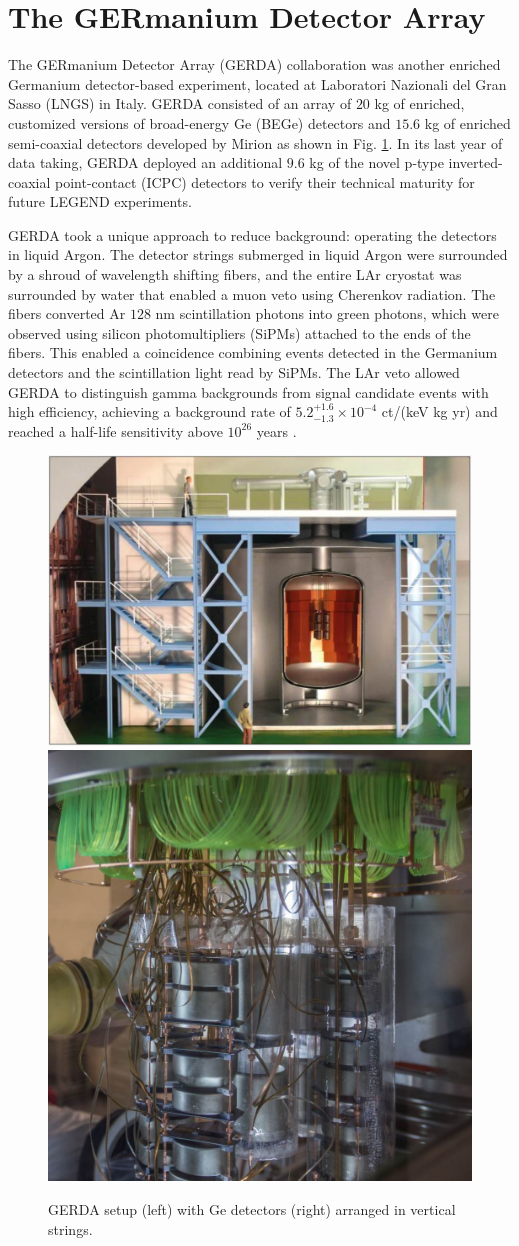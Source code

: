 \section{The GERmanium Detector Array}

The GERmanium Detector Array (GERDA) collaboration was another enriched Germanium detector-based experiment, located at Laboratori Nazionali del Gran Sasso (LNGS) in Italy. GERDA consisted of an array of $20$ kg of enriched, customized versions of broad-energy Ge (BEGe) detectors and $15.6$ kg of enriched semi-coaxial detectors developed by Mirion as shown in Fig. \ref{fig:gerda}. In its last year of data taking, GERDA deployed an additional $9.6$ kg of the novel p-type inverted-coaxial point-contact (ICPC) detectors to verify their technical maturity for future LEGEND experiments.

GERDA took a unique approach to reduce background: operating the detectors in liquid Argon. The detector strings submerged in liquid Argon were surrounded by a shroud of wavelength shifting fibers, and the entire LAr cryostat was surrounded by water that enabled a muon veto using Cherenkov radiation. The fibers converted Ar $128$ nm scintillation photons into green photons, which were observed using silicon photomultipliers (SiPMs) attached to the ends of the fibers. This enabled a coincidence combining events detected in the Germanium detectors and the scintillation light read by SiPMs. The LAr veto allowed GERDA to distinguish gamma backgrounds from {\onbb} signal candidate events with high efficiency, achieving a background rate of $5.2^{+1.6}_{-1.3}\times 10^{-4}$ ct/(keV kg yr) and reached a half-life sensitivity above $10^{26}$ years \cite{GERDA_final}.

\begin{figure}
\centering
\includegraphics[height=0.38\columnwidth]{ch2/figs/gerda_setup.pdf}
\qquad
\includegraphics[height=0.38\columnwidth]{ch2/figs/gerdastrings.pdf}
\caption{GERDA setup (left) with Ge detectors (right) arranged in vertical strings.}
\label{fig:gerda}
\end{figure}
  
